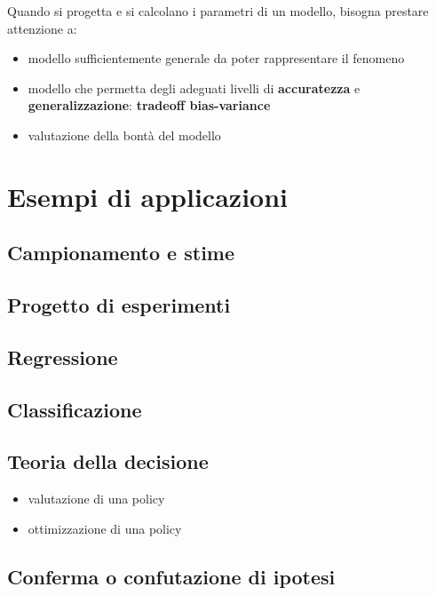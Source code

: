 {\color{red}
\vspace{10pt}
\noindent
Quando si progetta e si calcolano i parametri di un modello, bisogna prestare attenzione a:
\begin{itemize}
    \item modello sufficientemente generale da poter rappresentare il fenomeno
    \item modello che permetta degli adeguati livelli di \textbf{accuratezza} e \textbf{generalizzazione}: \textbf{tradeoff bias-variance}
    \item valutazione della bontà del modello
\end{itemize}
}

\chapter{Esempi di applicazioni}
\section{Campionamento e stime}

\section{Progetto di esperimenti}

\section{Regressione}

\section{Classificazione}

\section{Teoria della decisione}
{\color{red}
\begin{itemize}
    \item valutazione di una policy
    \item ottimizzazione di una policy
\end{itemize}}

\section{Conferma o confutazione di ipotesi}

